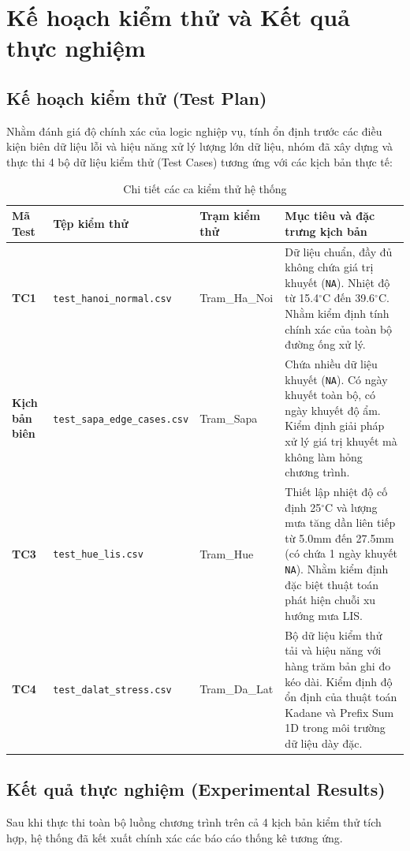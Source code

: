 \section{Kế hoạch kiểm thử và Kết quả thực nghiệm}

\subsection{Kế hoạch kiểm thử (Test Plan)}
Nhằm đánh giá độ chính xác của logic nghiệp vụ, tính ổn định trước các điều kiện biên dữ liệu lỗi và hiệu năng xử lý lượng lớn dữ liệu, nhóm đã xây dựng và thực thi 4 bộ dữ liệu kiểm thử (Test Cases) tương ứng với các kịch bản thực tế:

\begin{table}[htbp]
    \centering
    \caption{Chi tiết các ca kiểm thử hệ thống}
    \footnotesize
    \begin{tabularx}{\textwidth}{l|l|p{3.5cm}|X}
        \toprule
        \textbf{Mã Test} & \textbf{Tệp kiểm thử} & \textbf{Trạm kiểm thử} & \textbf{Mục tiêu và đặc trưng kịch bản} \\
        \midrule
        \textbf{TC1} & \texttt{test\_hanoi\_normal.csv} & Tram\_Ha\_Noi & Dữ liệu chuẩn, đầy đủ không chứa giá trị khuyết (\texttt{NA}). Nhiệt độ từ 15.4$^\circ$C đến 39.6$^\circ$C. Nhằm kiểm định tính chính xác của toàn bộ đường ống xử lý. \\ \hline
        \textbf{Kịch bản biên} & \texttt{test\_sapa\_edge\_cases.csv} & Tram\_Sapa & Chứa nhiều dữ liệu khuyết (\texttt{NA}). Có ngày khuyết toàn bộ, có ngày khuyết độ ẩm. Kiểm định giải pháp xử lý giá trị khuyết mà không làm hỏng chương trình. \\ \hline
        \textbf{TC3} & \texttt{test\_hue\_lis.csv} & Tram\_Hue & Thiết lập nhiệt độ cố định 25$^\circ$C và lượng mưa tăng dần liên tiếp từ 5.0mm đến 27.5mm (có chứa 1 ngày khuyết \texttt{NA}). Nhằm kiểm định đặc biệt thuật toán phát hiện chuỗi xu hướng mưa LIS. \\ \hline
        \textbf{TC4} & \texttt{test\_dalat\_stress.csv} & Tram\_Da\_Lat & Bộ dữ liệu kiểm thử tải và hiệu năng với hàng trăm bản ghi đo kéo dài. Kiểm định độ ổn định của thuật toán Kadane và Prefix Sum 1D trong môi trường dữ liệu dày đặc. \\
        \bottomrule
    \end{tabularx}
    \label{tab:test_cases}
\end{table}

\subsection{Kết quả thực nghiệm (Experimental Results)}
Sau khi thực thi toàn bộ luồng chương trình trên cả 4 kịch bản kiểm thử tích hợp, hệ thống đã kết xuất chính xác các báo cáo thống kê tương ứng.

